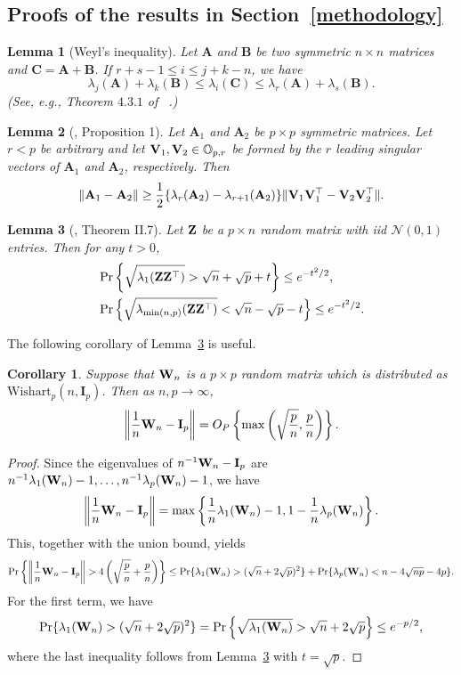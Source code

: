 \documentclass[times,sort&compress,3p]{elsarticle}
\newcommand{\BA}{\mathbf{A}}    \newcommand{\BB}{\mathbf{B}}    \newcommand{\BC}{\mathbf{C}}    \newcommand{\BD}{\mathbf{D}}    \newcommand{\BE}{\mathbf{E}}    \newcommand{\BF}{\mathbf{F}}    \newcommand{\BG}{\mathbf{G}}    \newcommand{\BH}{\mathbf{H}}    \newcommand{\BI}{\mathbf{I}}    \newcommand{\BJ}{\mathbf{J}}    \newcommand{\BK}{\mathbf{K}}    \newcommand{\BL}{\mathbf{L}}
\theoremstyle{plain}
\newtheorem{corollary}{\quad\quad Corollary}
\newtheorem{lemma}{\quad\quad Lemma}
\theoremstyle{definition}
\theoremstyle{remark}
\begin{document}
\begin{appendices}
\section{Proofs of the results in Section~\ref{methodology}}\label{appendixB}

\begin{lemma}[Weyl's inequality]
Let $\BA$ and $\BB$ be two symmetric $n\times n$ matrices and $\BC=\BA+\BB$. If $r+s-1 \leq  i\leq j+k-n$, we have
\begin{equation*}
\lambda_j(\BA)+\lambda_k(\BB)\leq \lambda_i(\BC) \leq \lambda_r(\BA)+\lambda_s(\BB).
\end{equation*}
    (See, e.g., Theorem $4.3.1$ of ~\cite{Horn1985Matrix}.)
\end{lemma}

\begin{lemma}[\cite{Cai2015Optimal}, Proposition 1]\label{pert}
    Let $\BA_1$ and $\BA_2$ be $p\times p$ symmetric matrices. Let $r<p$ be arbitrary and let $\mathbf{V}_1, \mathbf{V}_2\in \mathbb{O}_{p,r}$ be formed by the $r$ leading singular vectors of $\BA_1$ and $\BA_2$, respectively.
    Then
    $$
    \|\BA_1-\BA_2\|\geq \frac{1}{2}\{\lambda_r(\BA_2)-\lambda_{r+1}(\BA_2)\}\|\BV_1 \BV_1^\top - \BV_2 \BV_2^\top \|.
    $$
\end{lemma}


\begin{lemma}[\cite{DAVIDSON2001317}, Theorem II.7]\label{DSbound}
    Let $\mathbf{Z}$ be a $p\times n$ random matrix with iid $\mathcal{N}(0,1)$ entries.
    Then for any $t>0$,
    \begin{align*}
        &\Pr\left\{\sqrt{\lambda_1(\mathbf{Z} \mathbf{Z}^\top  )}>\sqrt{n}+\sqrt{p}+t\right\}\leq e^{-t^2/2},
        \\
        &\Pr\left\{\sqrt{\lambda_{\min(n,p)}(\mathbf{Z} \mathbf{Z}^\top  )}<\sqrt{n}-\sqrt{p}-t \right\}\leq e^{-t^2/2}.
    \end{align*}
\end{lemma}
    The following corollary of Lemma~\ref{DSbound} is useful.

\begin{corollary}\label{corNorm}
Suppose that $\mathbf{W}_n$ is a $p \times p$ random matrix which is distributed as $\mathrm{Wishart}_p(n,\BI_{p})$.
    Then as $n,p\to \infty$,
$$
\left\|\frac{1}{n}\BW_n-\BI_p\right\|=O_P\left\{\max\left(\sqrt{\frac{p}{n}},\frac{p}{n}\right)\right\}.
$$
\end{corollary}
\begin{proof}
    Since the eigenvalues of $n^{-1}\BW_n-\BI_p$ are $n^{-1}\lambda_1(\mathbf{W}_n)-1,\ldots, n^{-1}\lambda_p(\mathbf{W}_n)-1$, we have
    $$\left\|\frac{1}{n}\BW_n-\BI_p\right\|=\max\left\{\frac{1}{n}\lambda_1(\BW_n)-1,1-\frac{1}{n}\lambda_p(\BW_n)\right\}.$$
This, together with the union bound, yields
$$
\Pr\left\{\left\|\frac{1}{n}\BW_n-\BI_p\right\|>4\left(\sqrt{\frac{p}{n}}+\frac{p}{n}\right)\right\}
    \leq
    \Pr\{\lambda_1(\BW_n)>(\sqrt{n}+2\sqrt{p})^2\}+
    \Pr\{\lambda_p(\BW_n)<n-4\sqrt{np}-4p\}.
$$
    For the first term, we have    
    $$
    \Pr\{\lambda_1(\mathbf{W}_n)>(\sqrt{n}+2\sqrt{p})^2\}=
    \Pr\left\{\sqrt{\lambda_1(\mathbf{W}_n)}>\sqrt{n}+2\sqrt{p}\right\}\leq e^{-p/2},
    $$
 where the last inequality follows from Lemma~\ref{DSbound} with $t=\sqrt{p}$.


\end{proof}
\end{appendices}
\end{document}
